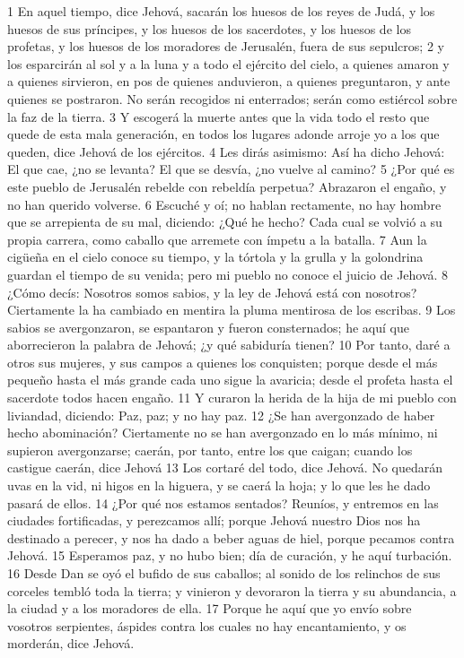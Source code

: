 1 En aquel tiempo, dice Jehová, sacarán los huesos de los reyes de Judá, y los huesos de sus príncipes, y los huesos de los sacerdotes, y los huesos de los profetas, y los huesos de los moradores de Jerusalén, fuera de sus sepulcros;
2 y los esparcirán al sol y a la luna y a todo el ejército del cielo, a quienes amaron y a quienes sirvieron, en pos de quienes anduvieron, a quienes preguntaron, y ante quienes se postraron. No serán recogidos ni enterrados; serán como estiércol sobre la faz de la tierra.
3 Y escogerá la muerte antes que la vida todo el resto que quede de esta mala generación, en todos los lugares adonde arroje yo a los que queden, dice Jehová de los ejércitos.
4 Les dirás asimismo: Así ha dicho Jehová: El que cae, ¿no se levanta? El que se desvía, ¿no vuelve al camino?
5 ¿Por qué es este pueblo de Jerusalén rebelde con rebeldía perpetua? Abrazaron el engaño, y no han querido volverse.
6 Escuché y oí; no hablan rectamente, no hay hombre que se arrepienta de su mal, diciendo: ¿Qué he hecho? Cada cual se volvió a su propia carrera, como caballo que arremete con ímpetu a la batalla.
7 Aun la cigüeña en el cielo conoce su tiempo, y la tórtola y la grulla y la golondrina guardan el tiempo de su venida; pero mi pueblo no conoce el juicio de Jehová.
8 ¿Cómo decís: Nosotros somos sabios, y la ley de Jehová está con nosotros? Ciertamente la ha cambiado en mentira la pluma mentirosa de los escribas.
9 Los sabios se avergonzaron, se espantaron y fueron consternados; he aquí que aborrecieron la palabra de Jehová; ¿y qué sabiduría tienen?
10 Por tanto, daré a otros sus mujeres, y sus campos a quienes los conquisten; porque desde el más pequeño hasta el más grande cada uno sigue la avaricia; desde el profeta hasta el sacerdote todos hacen engaño.
11 Y curaron la herida de la hija de mi pueblo con liviandad, diciendo: Paz, paz; y no hay paz. 
12 ¿Se han avergonzado de haber hecho abominación? Ciertamente no se han avergonzado en lo más mínimo, ni supieron avergonzarse; caerán, por tanto, entre los que caigan; cuando los castigue caerán, dice Jehová 
13 Los cortaré del todo, dice Jehová. No quedarán uvas en la vid, ni higos en la higuera, y se caerá la hoja; y lo que les he dado pasará de ellos.
14 ¿Por qué nos estamos sentados? Reuníos, y entremos en las ciudades fortificadas, y perezcamos allí; porque Jehová nuestro Dios nos ha destinado a perecer, y nos ha dado a beber aguas de hiel, porque pecamos contra Jehová.
15 Esperamos paz, y no hubo bien; día de curación, y he aquí turbación.
16 Desde Dan se oyó el bufido de sus caballos; al sonido de los relinchos de sus corceles tembló toda la tierra; y vinieron y devoraron la tierra y su abundancia, a la ciudad y a los moradores de ella.
17 Porque he aquí que yo envío sobre vosotros serpientes, áspides contra los cuales no hay encantamiento, y os morderán, dice Jehová.

